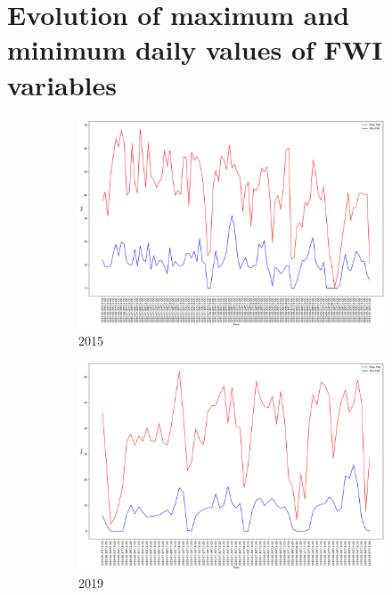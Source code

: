 \FloatBarrier

\section{Evolution of maximum and minimum daily values of FWI variables}
\begin{figure}[h]
	\centering
	\caption{Daily max and min FWI values}
	\begin{subfigure}{0.45\textwidth}
		\centering
		\includegraphics[width=\textwidth]{graphs/2015/byHour/FWI_maxMin.png}
		\caption{2015}
	\end{subfigure}
	\hfill
	\begin{subfigure}{0.45\textwidth}
		\centering
		\includegraphics[width=\textwidth]{graphs/2019/byHour/FWI_maxMin.png}
		\caption{2019}
	\end{subfigure}
	\hfill
	\begin{subfigure}{0.45\textwidth}

\end{subfigure}
\end{figure}

